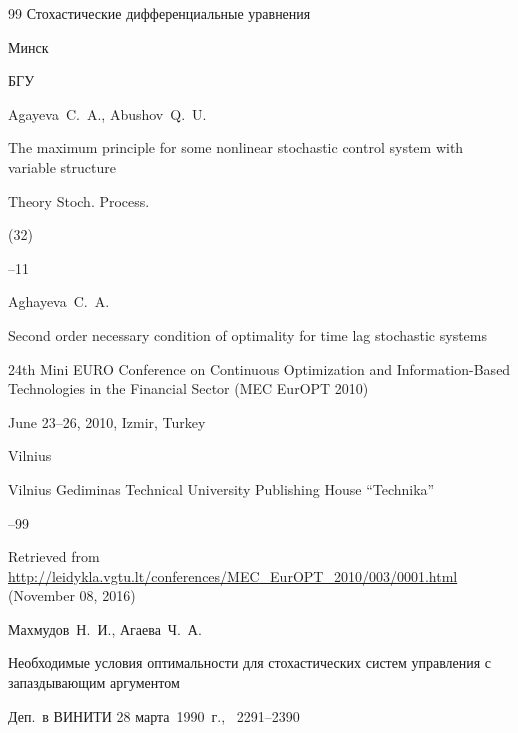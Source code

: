 \begin{thebibliography}{99}
\book Стохастические дифференциальные уравнения

\publaddr Минск

\publ БГУ






\by Agayeva~C.~A., Abushov~Q.~U.

\paper The maximum principle for some nonlinear stochastic control system with variable structure

\jour Theory Stoch. Process.


(32)


--11










\by Aghayeva~C.~A.

\paper Second order necessary condition of optimality for time lag stochastic systems

\inbook 24th Mini EURO Conference on Continuous Optimization and Information-Based Technologies in the Financial Sector (MEC EurOPT 2010)

\procinfo June 23--26, 2010, Izmir, Turkey

\publaddr Vilnius 

\publ Vilnius Gediminas Technical University Publishing House ``Technika''

--99

\elink Retrieved from \url{http://leidykla.vgtu.lt/conferences/MEC_EurOPT_2010/003/0001.html} {(November 08, 2016)}






\by Махмудов~Н.~И., Агаева~Ч.~А.

\preprint Необходимые условия оптимальности для стохастических систем управления с запаздывающим аргументом



\preprintinfo Деп.~в ВИНИТИ 28 марта~1990~г., \No~2291--2390




\end{thebibliography}
